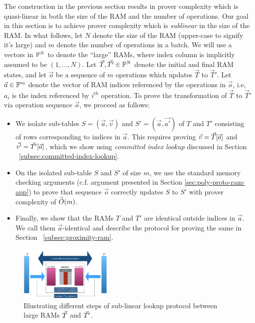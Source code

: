 
The construction in the previous section results in prover complexity which is quasi-linear in both the
size of the RAM and the number of operations.
Our goal in this section is to achieve prover complexity which is {\em sublinear} in the size of the RAM.
In what follows, let $N$ denote the size of the RAM (upper-case to signify it's large) and $m$ denote the number
of operations in a batch. We will use a vectors in $\mathbb{F}^N$ to denote the ``large'' RAMs, where index column is implicitly
assumed to be $(1,\ldots,N)$.
Let $\vec{T},\vec{T'}\in \mathbb{F}^N$ denote the initial and final RAM states, and let $\vec{o}$ be
a sequence of $m$ operations which updates $\vec{T}$ to $\vec{T}'$. Let $\vec{a}\in \mathbb{F}^m$ denote the vector
of RAM indices referenced by the operations in $\vec{o}$, i.e, $a_i$ is the index referenced by $i^{th}$ operation.
To prove the transformation of $\vec{T}$ to $\vec{T}'$ via operation sequence $\vec{o}$, we proceed as follows:
\begin{itemize}[leftmargin=2em, label=-]
    \item We isolate sub-tables $S=(\vec{a},\vec{v})$ and $S'=(\vec{a},\vec{a'})$ of $T$ and $T'$ consisting of
    rows corresponding to indices in $\vec{a}$. This requires proving $\vec{v}=\vec{T}[\vec{a}]$ and $\vec{v'}=
    \vec{T}'[\vec{a}]$, which we show using {\em committed index lookup} discussed in Section ~\ref{subsec:committed-index-lookup}.

    \item On the isolated sub-table $S$ and $S'$ of size $m$, we use the standard memory checking arguments (c.f. argument
    presented in Section \ref{sec:poly-proto-ram-app}) to prove that sequence $\vec{o}$ correctly updates $S$ to $S'$ with
    prover complexity of $\widetilde{O}(m)$.

    \item Finally, we show that the RAMs $T$ and $T'$ are identical outside indices in $\vec{a}$. We call them $\vec{a}$-identical
    and describe the protocol for proving the same in Section ~\ref{subsec:proximity-ram}.
\end{itemize}

\begin{figure}[htbp]
    \centering
    \includegraphics[width=0.4\textwidth]{RAM-Lookup}
    \caption{Illustrating different steps of sub-linear lookup protocol between large RAMs $\vec{T}$ and $\vec{T}'$.}
    \label{fig:blueprint}
\end{figure}

